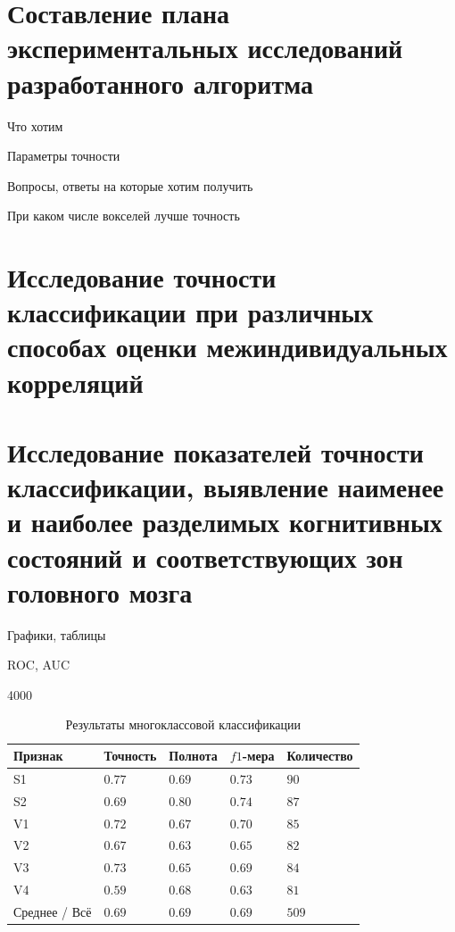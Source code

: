 \section{Составление плана экспериментальных исследований разработанного алгоритма}

Что хотим

Параметры точности

Вопросы, ответы на которые хотим получить

При каком числе вокселей лучше точность

\section{Исследование точности классификации при различных	способах оценки межиндивидуальных корреляций}

\section{Исследование показателей точности классификации, выявление наименее и наиболее разделимых когнитивных состояний и соответствующих зон головного мозга}

Графики, таблицы

ROC, AUC

4000

\begin{table}%
	\caption{Результаты многоклассовой классификации}\label{tbl:mul_res}%
	\centering
	\begin{tabu}{|X[1.1]|X|X|X|X|}
		\hline
		Признак               & Точность & Полнота & $f1$-мера & Количество \\ \hline
		S1                     & $0.77$     & $0.69$    & $0.73$      &$90$         \\ \hline
		S2                    & $0.69$     & $0.80$    & $0.74$      &$87$         \\ \hline
		V1                     & $0.72$     &$0.67$    &$0.70$      &$85$         \\ \hline
		V2                    &$0.67$     &$0.63$    &$0.65$      &$82$         \\ \hline
		V3                     &$0.73$     &$0.65$    &$0.69$      &$84$         \\ \hline
		V4                     &$0.59$     &$0.68$    &$0.63$      &$81$         \\ \hline
		Среднее / Всё &$0.69$     &$0.69$    &$0.69$      &$509$        \\ \hline
	\end{tabu}
\end{table}

